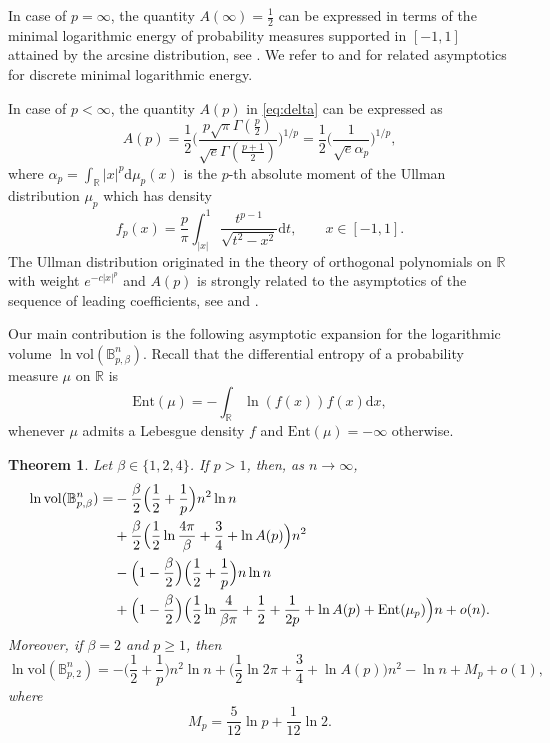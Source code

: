 \documentclass[a4paper,12pt,reqno]{amsart}
\newtheorem{theorem}{Theorem}
\theoremstyle{definition}
\newcommand{\IB}{\mathbb{B}}
\newcommand{\IR}{\mathbb{R}}
\newcommand{\Ent}{\mathrm{Ent}}
\newcommand{\vol}{\mathrm{vol}}
\newcommand{\dd}{\mathrm{d}}
\newcommand{\bpb}{\mathbb{B}_{p,\beta}^n}
\begin{document}
In case of $p=\infty$, the quantity $A(\infty)=\frac{1}{2}$ can be expressed in terms of the minimal logarithmic energy of probability measures supported in $[-1,1]$ attained by the arcsine distribution, see \cite{ST97}. We refer to \cite{BDF+24} and \cite{Bra24} for related asymptotics for discrete minimal logarithmic energy. 

In case of $p<\infty$, the quantity $A(p)$ in \eqref{eq:delta} can be expressed as 
\[
A(p)
=\frac{1}{2}\Big(\frac{p\sqrt{\pi}\Gamma(\frac{p}{2})}{\sqrt{e}\Gamma(\frac{p+1}{2})}\Big)^{1/p}
=\frac{1}{2}\Big(\frac{1}{\sqrt{e}\alpha_p}\Big)^{1/p},
\]
where $\alpha_p=\int_{\IR} |x|^p\dd\mu_p(x)$ is the $p$-th absolute moment of the Ullman distribution $\mu_p$ which has density
\begin{equation} \label{eq:ullman-1}
f_p(x)
= \frac{p}{\pi}\int_{|x|}^1 \frac{t^{p-1}}{\sqrt{t^2-x^2}}\dd t, \qquad x\in [-1,1].
\end{equation}
The Ullman distribution originated in the theory of orthogonal polynomials on $\IR$ with weight $e^{-c|x|^p}$ and $A(p)$ is strongly related to the asymptotics of the sequence of leading coefficients, see \cite{ST97} and \cite[Sec. 4.1]{Ass87}. 

Our main contribution is the following asymptotic expansion for the logarithmic volume $\ln \vol(\bpb)$. Recall that the differential entropy of a probability measure $\mu$ on $\IR$ is
\[
\Ent(\mu)
= -\int_{\IR}\ln(f(x))f(x)\dd x, 
\]
whenever $\mu$ admits a Lebesgue density $f$ and $\Ent(\mu)=-\infty$ otherwise. 

\begin{theorem} \label{thm:main}
Let $\beta\in \{1,2,4\}$. If $p>1$, then, as $n\to\infty$, 
\begin{align}\label{eq:main-1}
\ln \vol(\bpb)
=&-\frac{\beta}{2}\Big(\frac{1}{2}+\frac{1}{p}\Big)n^2\ln n\notag\\
&+\frac{\beta}{2}\Big(\frac{1}{2}\ln\frac{4\pi}{\beta}+\frac{3}{4}+\ln A(p)\Big)n^2\notag\\
&-\Big(1-\frac{\beta}{2}\Big)\Big(\frac{1}{2}+\frac{1}{p}\Big)n\ln n\notag\\
&+\Big(1-\frac{\beta}{2}\Big)\Big(\frac{1}{2}\ln\frac{4}{\beta\pi}+\frac{1}{2}+\frac{1}{2p}+\ln A(p)+\Ent(\mu_p)\Big)n +o(n).
\end{align}
Moreover, if $\beta=2$ and $p\ge 1$, then
\begin{equation} \label{eq:main-2}
\ln \vol(\IB_{p,2}^n)
=-\Big(\frac{1}{2}+\frac{1}{p}\Big)n^2\ln n
+\Big(\frac{1}{2}\ln 2\pi +\frac{3}{4}+\ln A(p)\Big)n^2
-\ln n+M_{p}+o(1),
\end{equation}
where
\[
M_{p}=\frac{5}{12}\ln p+\frac{1}{12}\ln 2.
\]
\end{theorem}
\end{document}
